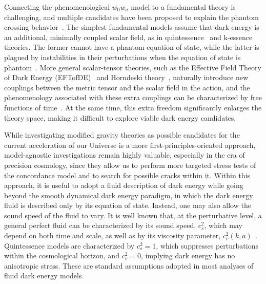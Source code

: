 \documentclass[%
reprint,
superscriptaddress,
preprint numbers,
nofootinbib,
amsmath,amssymb,
aps,
prd
]{revtex4-2}
\begin{document}
Connecting the phenomenological $w_0w_a$ model to a fundamental theory is challenging, and multiple candidates have been proposed to explain the phantom crossing behavior~\cite{desi_constraints_ide, desi_coupled_de_dm, desi_general_param, desi_interacting_de, desi_mg, desi_monodromic_de, desi_non_minimal_grav, desi_quintessential, desi_sign_switching, dde_scale_dependence}. The simplest fundamental models assume that dark energy is an additional, minimally coupled scalar field, as in quintessence~\cite{Ratra1988, Caldwell1998} and k-essence~\cite{kessence} theories. The former cannot have a phantom equation of state, while the latter is plagued by instabilities in their perturbations when the equation of state is phantom~\cite{quintom, de_phantom_instability, de_phantom_instability_2, phantom_crossing_gr}. More general scalar-tensor theories, such as the Effective Field Theory of Dark Energy (EFTofDE)~\cite{EFTofDE_1, EFTofDE_2, EFTofDE_review} and Horndeski theory~\cite{horndeski}, naturally introduce new couplings between the metric tensor and the scalar field in the action, and the phenomenology associated with these extra couplings can be characterized by free functions of time~\cite{bellini_sawicky}. At the same time, this extra freedom significantly enlarges the theory space, making it difficult to explore viable dark energy candidates.

While investigating modified gravity theories as possible candidates for the current acceleration of our Universe is a more first-principles-oriented approach, model-agnostic investigations remain highly valuable, especially in the era of precision cosmology, since they allow us to perform more targeted stress tests of the concordance model and to search for possible cracks within it. Within this approach, it is useful to adopt a fluid description of dark energy while going beyond the smooth dynamical dark energy paradigm, in which the dark energy fluid is described only by its equation of state. Instead, one may also allow the sound speed of the fluid to vary. It is well known that, at the perturbative level, a general perfect fluid can be characterized by its sound speed, $c_s^2$, which may depend on both time and scale, as well as by its viscosity parameter, $c_v^2(k,a)$~\cite{gdm_hu,Kodama:1984ziu}. Quintessence models are characterized by $c_s^2 = 1$, which suppresses perturbations within the cosmological horizon, and $c_v^2 = 0$, implying dark energy has no anisotropic stress. These are standard assumptions adopted in most analyses of fluid dark energy models.
\end{document}
